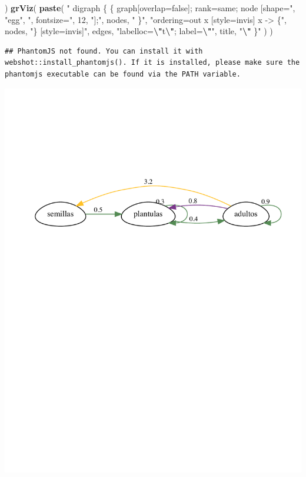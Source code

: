 \documentclass[
]{book}
\newenvironment{Shaded}{\begin{snugshade}}{\end{snugshade}}
\newcommand{\DecValTok}[1]{\textcolor[rgb]{0.00,0.00,0.81}{#1}}
\newcommand{\FunctionTok}[1]{\textcolor[rgb]{0.13,0.29,0.53}{\textbf{#1}}}
\newcommand{\NormalTok}[1]{#1}
\newcommand{\SpecialCharTok}[1]{\textcolor[rgb]{0.81,0.36,0.00}{\textbf{#1}}}
\newcommand{\StringTok}[1]{\textcolor[rgb]{0.31,0.60,0.02}{#1}}
\theoremstyle{definition}
\theoremstyle{definition}
\theoremstyle{definition}
\theoremstyle{definition}
\theoremstyle{remark}
\begin{document}
\begin{Shaded}
\begin{Highlighting}[]
\NormalTok{)}
\FunctionTok{grViz}\NormalTok{(}
  \FunctionTok{paste}\NormalTok{(}
    \StringTok{"}
\StringTok{digraph \{}
\StringTok{  \{}
\StringTok{    graph[overlap=false];}
\StringTok{    rank=same;}
\StringTok{    node [shape="}\NormalTok{, }\StringTok{"egg"}\NormalTok{, }\StringTok{", fontsize="}\NormalTok{, }\DecValTok{12}\NormalTok{, }\StringTok{"];"}\NormalTok{,}
\NormalTok{    nodes, }\StringTok{"}
\StringTok{  \}"}\NormalTok{,}
    \StringTok{"ordering=out}
\StringTok{  x [style=invis]}
\StringTok{  x {-}\textgreater{} \{"}\NormalTok{, nodes, }\StringTok{"\} [style=invis]"}\NormalTok{, edges,}
    \StringTok{"labelloc=}\SpecialCharTok{\textbackslash{}"}\StringTok{t}\SpecialCharTok{\textbackslash{}"}\StringTok{;}
\StringTok{  label=}\SpecialCharTok{\textbackslash{}"}\StringTok{"}\NormalTok{, title, }\StringTok{"}\SpecialCharTok{\textbackslash{}"}
\StringTok{\}"}
\NormalTok{  )}
\NormalTok{) }
\end{Highlighting}
\end{Shaded}

\begin{verbatim}
## PhantomJS not found. You can install it with webshot::install_phantomjs(). If it is installed, please make sure the phantomjs executable can be found via the PATH variable.
\end{verbatim}

\includegraphics{Diagnostico_Poblacional_files/figure-latex/chap2_2-1.pdf}
\end{document}
